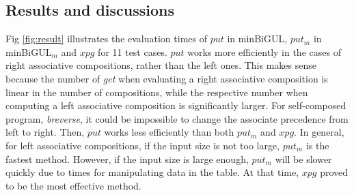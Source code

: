 \subsection{Results and discussions}



Fig \ref{fig:result} illustrates the evaluation times of $put$ in minBiGUL, $put_m$ in minBiGUL$_m$ and $xpg$ for 11 test cases. $put$ works more efficiently in the cases of right associative compositions, rather than the left ones. This makes sense because the number of \textit{get} when evaluating a right associative composition is linear in the number of compositions, while the respective number when computing a left associative composition is significantly larger. For self-composed program, \textit{breverse}, it could be impossible to change the associate precedence from left to right. Then, $put$ works less efficiently than both $put_m$ and $xpg$. In general, for left associative compositions, if the input size is not too large, $put_m$ is the fastest method. However, if the input size is large enough, $put_m$ will be slower quickly due to times for manipulating data in the table. At that time, $xpg$ proved to be the most effective method.
